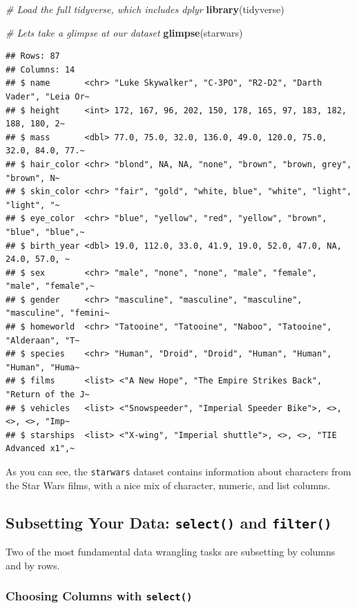 \documentclass[
  11pt,
]{article}
\newenvironment{Shaded}{\begin{snugshade}}{\end{snugshade}}
\newcommand{\CommentTok}[1]{\textcolor[rgb]{0.56,0.35,0.01}{\textit{#1}}}
\newcommand{\FunctionTok}[1]{\textcolor[rgb]{0.13,0.29,0.53}{\textbf{#1}}}
\newcommand{\NormalTok}[1]{#1}
\begin{document}
\begin{Shaded}
\begin{Highlighting}[]
\CommentTok{\# Load the full tidyverse, which includes dplyr}
\FunctionTok{library}\NormalTok{(tidyverse)}

\CommentTok{\# Let\textquotesingle{}s take a glimpse at our dataset}
\FunctionTok{glimpse}\NormalTok{(starwars)}
\end{Highlighting}
\end{Shaded}

\begin{verbatim}
## Rows: 87
## Columns: 14
## $ name       <chr> "Luke Skywalker", "C-3PO", "R2-D2", "Darth Vader", "Leia Or~
## $ height     <int> 172, 167, 96, 202, 150, 178, 165, 97, 183, 182, 188, 180, 2~
## $ mass       <dbl> 77.0, 75.0, 32.0, 136.0, 49.0, 120.0, 75.0, 32.0, 84.0, 77.~
## $ hair_color <chr> "blond", NA, NA, "none", "brown", "brown, grey", "brown", N~
## $ skin_color <chr> "fair", "gold", "white, blue", "white", "light", "light", "~
## $ eye_color  <chr> "blue", "yellow", "red", "yellow", "brown", "blue", "blue",~
## $ birth_year <dbl> 19.0, 112.0, 33.0, 41.9, 19.0, 52.0, 47.0, NA, 24.0, 57.0, ~
## $ sex        <chr> "male", "none", "none", "male", "female", "male", "female",~
## $ gender     <chr> "masculine", "masculine", "masculine", "masculine", "femini~
## $ homeworld  <chr> "Tatooine", "Tatooine", "Naboo", "Tatooine", "Alderaan", "T~
## $ species    <chr> "Human", "Droid", "Droid", "Human", "Human", "Human", "Huma~
## $ films      <list> <"A New Hope", "The Empire Strikes Back", "Return of the J~
## $ vehicles   <list> <"Snowspeeder", "Imperial Speeder Bike">, <>, <>, <>, "Imp~
## $ starships  <list> <"X-wing", "Imperial shuttle">, <>, <>, "TIE Advanced x1",~
\end{verbatim}

As you can see, the \texttt{starwars} dataset contains information about
characters from the Star Wars films, with a nice mix of character,
numeric, and list columns.

\subsection{\texorpdfstring{Subsetting Your Data: \texttt{select()} and
\texttt{filter()}}{Subsetting Your Data: select() and filter()}}\label{subsetting-your-data-select-and-filter}

Two of the most fundamental data wrangling tasks are subsetting by
columns and by rows.

\subsubsection{\texorpdfstring{Choosing Columns with
\texttt{select()}}{Choosing Columns with select()}}\label{choosing-columns-with-select}
\end{document}
